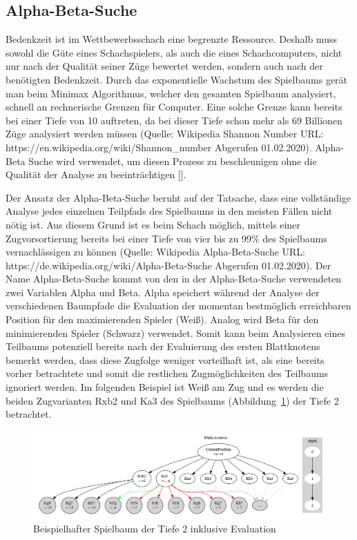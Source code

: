\subsection{Alpha-Beta-Suche} \label{ch:alpha-beta-pruning}

Bedenkzeit ist im Wettbewerbsschach eine begrenzte Ressource.
Deshalb muss sowohl die Güte eines Schachspielers, als auch die eines Schachcomputers, nicht nur nach der Qualität seiner Züge bewertet werden, sondern auch nach der benötigten Bedenkzeit.
Durch das exponentielle Wachstum des Spielbaums gerät man beim Minimax Algorithmus, welcher den gesamten Spielbaum analysiert, schnell an rechnerische Grenzen für Computer.
Eine solche Grenze kann bereits bei einer Tiefe von 10 auftreten, da bei dieser Tiefe schon mehr als 69 Billionen Züge analysiert werden müssen (Quelle: Wikipedia Shannon Number URL: https://en.wikipedia.org/wiki/Shannon_number Abgerufen 01.02.2020).
Alpha-Beta Suche wird verwendet, um diesen Prozess zu beschleunigen ohne die Qualität der Analyse zu beeinträchtigen [\cite{Knuth1975}].

Der Ansatz der Alpha-Beta-Suche beruht auf der Tatsache, dass eine vollständige Analyse jedes einzelnen Teilpfads des Spielbaums in den meisten Fällen nicht nötig ist.
Aus diesem Grund ist es beim Schach möglich, mittels einer Zugvorsortierung bereits bei einer Tiefe von vier bis zu 99\% des Spielbaums vernachlässigen zu können (Quelle: Wikipedia Alpha-Beta-Suche URL: https://de.wikipedia.org/wiki/Alpha-Beta-Suche Abgerufen 01.02.2020).
Der Name Alpha-Beta-Suche kommt von den in der Alpha-Beta-Suche verwendeten zwei Variablen Alpha und Beta.
Alpha speichert während der Analyse der verschiedenen Baumpfade die Evaluation der momentan bestmöglich erreichbaren Position für den maximierenden Spieler (Weiß).
Analog wird Beta für den minimierenden Spieler (Schwarz) verwendet.
Somit kann beim Analysieren eines Teilbaums potenziell bereits nach der Evaluierung des ersten Blattknotens bemerkt werden, dass diese Zugfolge weniger vorteilhaft ist, als eine bereits vorher betrachtete und somit die restlichen Zugmöglichkeiten des Teilbaums ignoriert werden.
Im folgenden Beispiel ist Weiß am Zug und es werden die beiden Zugvarianten Rxb2 und Ka3 des Spielbaums (Abbildung~\ref{fig:alpha-beta_game-tree}) der Tiefe 2 betrachtet.

\begin{figure}
    \centering
    \includegraphics[width=\textwidth]{images/theory/AlphaBetaExample2.png}
    \caption[Beispielhafter Spielbaum der Tiefe 2 inklusive Evaluation]{Beispielhafter Spielbaum der Tiefe 2 inklusive Evaluation}
    \label{fig:alpha-beta_game-tree}
\end{figure}

